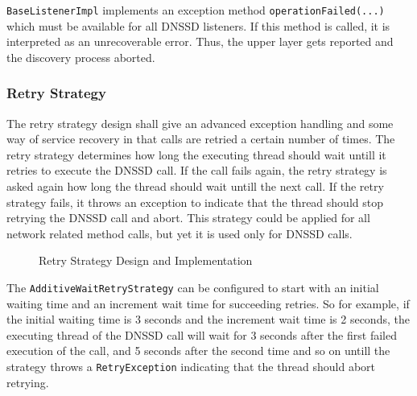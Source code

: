 \texttt{BaseListenerImpl} implements an exception method \texttt{operationFailed(...)} which must be available for all DNSSD listeners. If this method is called, it is interpreted as an unrecoverable error. Thus, the upper layer gets reported and the discovery process aborted.

\subsubsection{Retry Strategy}
The retry strategy design shall give an advanced exception handling and some way of service recovery in that calls are retried a certain number of times. The retry strategy determines how long the executing thread should wait untill it retries to execute the DNSSD call. If the call fails again, the retry strategy is asked again how long the thread should wait untill the next call. If the retry strategy fails, it throws an exception to indicate that the thread should stop retrying the DNSSD call and abort. This strategy could be applied for all network related method calls, but yet it is used only for DNSSD calls. 

\begin{figure}[H]
 \centering
 \caption{Retry Strategy Design and Implementation}
 \label{fig:network.discovery.retrystrategy}
\end{figure}

The \texttt{AdditiveWaitRetryStrategy} can be configured to start with an initial waiting time and an increment wait time for succeeding retries. So for example, if the initial waiting time is 3 seconds and the increment wait time is 2 seconds, the executing thread of the DNSSD call will wait for 3 seconds after the first failed execution of the call, and 5 seconds after the second time and so on untill the strategy throws a \texttt{RetryException} indicating that the thread should abort retrying.

